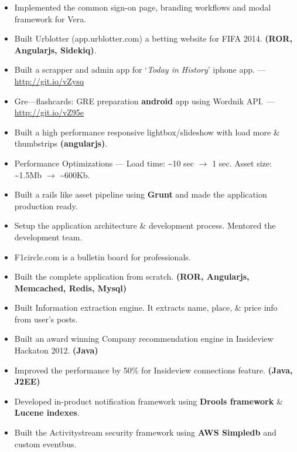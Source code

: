\documentclass{resume}
\begin{document}
\begin{itemize} \itemsep1pt \parskip0pt
  \item Implemented the common sign-on page, branding workflows and modal framework for Vera.
  \item Built Urblotter (app.urblotter.com) a betting website for FIFA 2014. \textbf{(ROR, Angularjs, Sidekiq)}.
  \item Built a scrapper and admin app for `\textit{Today in History}' iphone app. --- \url{http://git.io/vZysq}
  \item Gre---flashcards: GRE preparation \textbf{android} app using Wordnik API\@. --- \url{http://git.io/vZ95e}
\end{itemize}
\begin{itemize} \itemsep1pt \parskip0pt
  \item Built a high performance responsive lightbox/slideshow with load more \& thumbstrips \textbf{(angularjs)}.
  \item Performance Optimizations --- Load time: \textasciitilde10 sec \( \rightarrow \) 1 sec.  
    Asset size: \textasciitilde1.5Mb \( \rightarrow \) \textasciitilde600Kb.
  \item Built a rails like asset pipeline using \textbf{Grunt} and made the application production ready.
  \item Setup the application architecture \& development process. Mentored the development team.
\end{itemize}
\begin{itemize} \itemsep1pt \parskip0pt
  \item F1circle.com is a bulletin board for professionals.
  \item Built the complete application from scratch. \textbf{(ROR, Angularjs, Memcached, Redis, Mysql)}
  \item Built Information extraction engine. It extracts name, place, \& price info from user's posts.
\end{itemize}
\begin{itemize} \itemsep1pt \parskip0pt
  \item Built an award winning Company recommendation engine in Insideview Hackaton 2012. \textbf{(Java)}
  \item Improved the performance by 50\% for Insideview connections feature. \textbf{(Java, J2EE)}
  \item Developed in-product notification framework using \textbf{Drools framework} \& \textbf{Lucene indexes}.
  \item Built the Activitystream security framework using \textbf{AWS Simpledb} and custom eventbus.
\end{itemize}
\end{document}
